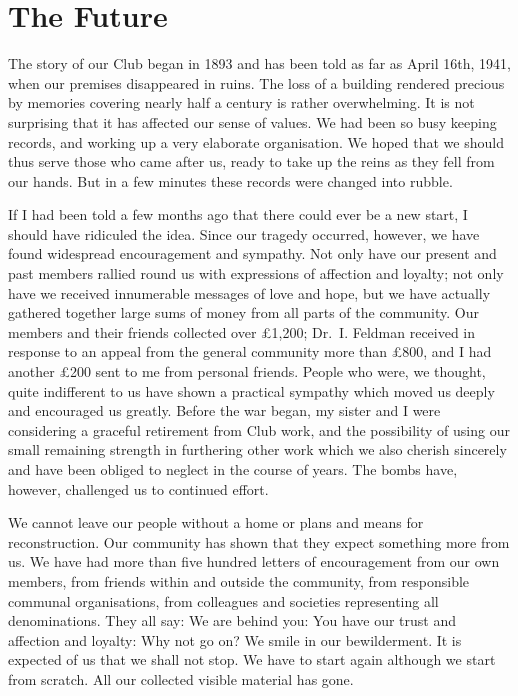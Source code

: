 \chapter{The Future}

The story of our Club began in 1893 and has been told
as far as April 16th, 1941, when our premises disappeared
in ruins. The loss of a building rendered precious by
memories covering nearly half a century is rather overwhelming.
It is not surprising that it has affected our
sense of values. We had been so busy keeping records,
and working up a very elaborate organisation. We hoped
that we should thus serve those who came after us,
ready to take up the reins as they fell from our hands.
But in a few minutes these records were changed into
rubble.

If I had been told a few months ago that there could
ever be a new start, I should have ridiculed the
idea. Since our tragedy occurred, however, we have
found widespread encouragement and sympathy. Not
only have our present and past members rallied round us
with expressions of affection and loyalty; not only have
we received innumerable messages of love and hope, but
we have actually gathered together large sums of money
from all parts of the community. Our members and
their friends collected over £1,200; Dr.\ I. Feldman
received in response to an appeal from the general community
more than £800, and I had another £200 sent
to me from personal friends. People who were, we
thought, quite indifferent to us have shown a practical
sympathy which moved us deeply and encouraged us
greatly. Before the war began, my sister and I were
considering a graceful retirement from Club work, and
the possibility of using our small remaining strength in
furthering other work which we also cherish sincerely and
have been obliged to neglect in the course of years. The
bombs have, however, challenged us to continued effort.

We cannot leave our people without a home or plans
and means for reconstruction. Our community has
shown that they expect something more from us. We
have had more than five hundred letters of encouragement
from our own members, from friends within and
outside the community, from responsible communal
organisations, from colleagues and societies representing
all denominations. They all say: We are behind you:
You have our trust and affection and loyalty: Why not
go on? We smile in our bewilderment. It is expected of
us that we shall not stop. We have to start again although
we start from scratch. All our collected visible material
has gone.

